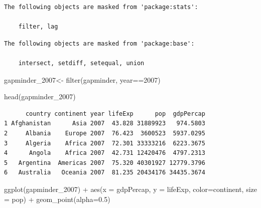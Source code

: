 \documentclass[
  letterpaper,
  DIV=11,
  numbers=noendperiod]{scrartcl}
\newenvironment{Shaded}{\begin{snugshade}}{\end{snugshade}}
\newcommand{\AttributeTok}[1]{\textcolor[rgb]{0.40,0.45,0.13}{#1}}
\newcommand{\DecValTok}[1]{\textcolor[rgb]{0.68,0.00,0.00}{#1}}
\newcommand{\FloatTok}[1]{\textcolor[rgb]{0.68,0.00,0.00}{#1}}
\newcommand{\FunctionTok}[1]{\textcolor[rgb]{0.28,0.35,0.67}{#1}}
\newcommand{\NormalTok}[1]{\textcolor[rgb]{0.00,0.23,0.31}{#1}}
\newcommand{\OtherTok}[1]{\textcolor[rgb]{0.00,0.23,0.31}{#1}}
\newcommand{\SpecialCharTok}[1]{\textcolor[rgb]{0.37,0.37,0.37}{#1}}
\begin{document}
\begin{verbatim}
The following objects are masked from 'package:stats':

    filter, lag
\end{verbatim}

\begin{verbatim}
The following objects are masked from 'package:base':

    intersect, setdiff, setequal, union
\end{verbatim}

\begin{Shaded}
\begin{Highlighting}[]
\NormalTok{gapminder\_2007}\OtherTok{\textless{}{-}} \FunctionTok{filter}\NormalTok{(gapminder, year}\SpecialCharTok{==}\DecValTok{2007}\NormalTok{)}

\FunctionTok{head}\NormalTok{(gapminder\_2007)}
\end{Highlighting}
\end{Shaded}

\begin{verbatim}
      country continent year lifeExp      pop  gdpPercap
1 Afghanistan      Asia 2007  43.828 31889923   974.5803
2     Albania    Europe 2007  76.423  3600523  5937.0295
3     Algeria    Africa 2007  72.301 33333216  6223.3675
4      Angola    Africa 2007  42.731 12420476  4797.2313
5   Argentina  Americas 2007  75.320 40301927 12779.3796
6   Australia   Oceania 2007  81.235 20434176 34435.3674
\end{verbatim}

\begin{Shaded}
\begin{Highlighting}[]
\FunctionTok{ggplot}\NormalTok{(gapminder\_2007) }\SpecialCharTok{+} 
  \FunctionTok{aes}\NormalTok{(}\AttributeTok{x =}\NormalTok{ gdpPercap, }\AttributeTok{y =}\NormalTok{ lifeExp, }\AttributeTok{color=}\NormalTok{continent, }\AttributeTok{size =}\NormalTok{ pop) }\SpecialCharTok{+}
  \FunctionTok{geom\_point}\NormalTok{(}\AttributeTok{alpha=}\FloatTok{0.5}\NormalTok{)}
\end{Highlighting}
\end{Shaded}
\end{document}

